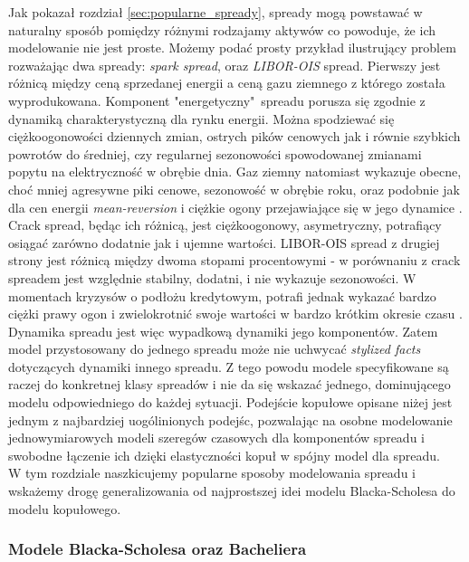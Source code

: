 Jak pokazał rozdział \ref{sec:popularne_spready}, spready mogą powstawać w naturalny sposób pomiędzy różnymi rodzajamy aktywów co powoduje, że ich modelowanie nie jest proste. Możemy podać prosty przykład ilustrujący problem rozważając dwa spready: \emph{spark spread}, oraz \emph{LIBOR-OIS} spread. Pierwszy jest różnicą między ceną sprzedanej energii a ceną gazu ziemnego z którego została wyprodukowana. Komponent "energetyczny"~spreadu porusza się zgodnie z dynamiką charakterystyczną dla rynku energii. Można spodziewać się ciężkoogonowości dziennych zmian, ostrych pików cenowych jak i równie szybkich powrotów do średniej, czy regularnej sezonowości spowodowanej zmianami popytu na elektryczność w obrębie dnia. Gaz ziemny natomiast wykazuje obecne, choć mniej agresywne piki cenowe, sezonowość w obrębie roku, oraz podobnie jak dla cen energii \emph{mean-reversion} i ciężkie ogony przejawiające się w jego dynamice \cite{Espen_Crack_Spread_Copula}. Crack spread, będąc ich różnicą, jest ciężkoogonowy, asymetryczny, potrafiący osiągać zarówno dodatnie jak i ujemne wartości. LIBOR-OIS spread z drugiej strony jest różnicą między dwoma stopami procentowymi - w porównaniu z crack spreadem jest względnie stabilny, dodatni, i nie wykazuje sezonowości. W momentach kryzysów o podłożu kredytowym, potrafi jednak wykazać bardzo ciężki prawy ogon i zwielokrotnić swoje wartości w bardzo krótkim okresie czasu \cite{Libor_OIS_model}.\\

Dynamika spreadu jest więc wypadkową dynamiki jego komponentów. Zatem model przystosowany do jednego spreadu może nie uchwycać \emph{stylized facts} dotyczących dynamiki innego spreadu. Z tego powodu modele specyfikowane są raczej do konkretnej klasy spreadów i nie da się wskazać jednego, dominującego modelu odpowiedniego do każdej sytuacji. Podejście kopułowe opisane niżej jest jednym z najbardziej uogólinionych podejśc, pozwalając na osobne modelowanie jednowymiarowych modeli szeregów czasowych dla komponentów spreadu i swobodne łączenie ich dzięki elastyczności kopuł w spójny model dla spreadu.\\

W tym rozdziale naszkicujemy popularne sposoby modelowania spreadu i wskażemy drogę generalizowania od najprostszej idei modelu Blacka-Scholesa do modelu kopułowego.

\subsubsection{Modele Blacka-Scholesa oraz Bacheliera}

